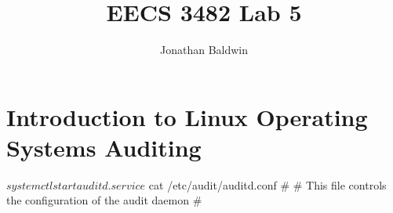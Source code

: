 \documentclass[]{report}
\title{EECS 3482 Lab 5}
\author{Jonathan Baldwin}
\date{}
\newenvironment{Shaded}{}{}
\newcommand{\NormalTok}[1]{#1}
\begin{document}
\maketitle

\hypertarget{introduction-to-linux-operating-systems-auditing}{%
\chapter{Introduction to Linux Operating Systems
Auditing}\label{introduction-to-linux-operating-systems-auditing}}

\begin{Shaded}
\begin{Highlighting}[]
\NormalTok{$ systemctl start auditd.service}
\NormalTok{$ cat /etc/audit/auditd.conf}
\NormalTok{#}
\NormalTok{# This file controls the configuration of the audit daemon}
\NormalTok{#}


\end{Highlighting}
\end{Shaded}
\end{document}
